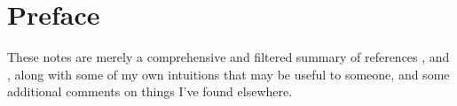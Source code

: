 \chapter*{Preface}

These notes are merely a comprehensive and filtered summary of references \cite{minter}, \cite{jech} and \cite{kanamori}, along with some of my own intuitions that may be useful to someone, and some additional comments on things I've found elsewhere.
